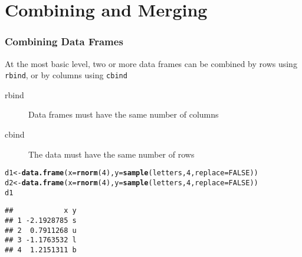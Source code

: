 \documentclass[paper=screen,mathserif]{beamer}\usepackage[]{graphicx}\usepackage[]{color}
\makeatletter
\newcommand{\hlnum}[1]{\textcolor[rgb]{0.686,0.059,0.569}{#1}}%
\newcommand{\hlstd}[1]{\textcolor[rgb]{0.345,0.345,0.345}{#1}}%
\newcommand{\hlkwb}[1]{\textcolor[rgb]{0.69,0.353,0.396}{#1}}%
\newcommand{\hlkwc}[1]{\textcolor[rgb]{0.333,0.667,0.333}{#1}}%
\newcommand{\hlkwd}[1]{\textcolor[rgb]{0.737,0.353,0.396}{\textbf{#1}}}%
\newenvironment{kframe}{%
 \def\at@end@of@kframe{}%
 \ifinner\ifhmode%
  \def\at@end@of@kframe{\end{minipage}}%
  \begin{minipage}{\columnwidth}%
 \fi\fi%
 \def\FrameCommand##1{\hskip\@totalleftmargin \hskip-\fboxsep
 \colorbox{shadecolor}{##1}\hskip-\fboxsep
     \hskip-\linewidth \hskip-\@totalleftmargin \hskip\columnwidth}%
 \MakeFramed {\advance\hsize-\width
   \@totalleftmargin\z@ \linewidth\hsize
   \@setminipage}}%
 {\par\unskip\endMakeFramed%
 \at@end@of@kframe}
\newenvironment{knitrout}{}{} %
\newcommand{\ft}[1]{\frametitle{#1}}
\makeatother
\begin{document}
\section{Combining and Merging}

\begin{frame}[fragile]
  \ft{Combining Data Frames}
  
  At the most basic level, two or more data frames can be combined by
  rows using \verb=rbind=, or by columns using \verb=cbind=
  \begin{description}
  \item[rbind] Data frames must have the same number of columns
  \item[cbind] The data must have the same number of rows
  \end{description} 
\begin{knitrout}\scriptsize
{}\color{fgcolor}\begin{kframe}
\begin{alltt}
\hlstd{d1} \hlkwb{<-} \hlkwd{data.frame}\hlstd{(}\hlkwc{x} \hlstd{=} \hlkwd{rnorm}\hlstd{(}\hlnum{4}\hlstd{),} \hlkwc{y} \hlstd{=} \hlkwd{sample}\hlstd{(letters,} \hlnum{4}\hlstd{,} \hlkwc{replace} \hlstd{=} \hlnum{FALSE}\hlstd{))}
\hlstd{d2} \hlkwb{<-} \hlkwd{data.frame}\hlstd{(}\hlkwc{x} \hlstd{=} \hlkwd{rnorm}\hlstd{(}\hlnum{4}\hlstd{),} \hlkwc{y} \hlstd{=} \hlkwd{sample}\hlstd{(letters,} \hlnum{4}\hlstd{,} \hlkwc{replace} \hlstd{=} \hlnum{FALSE}\hlstd{))}
\hlstd{d1}
\end{alltt}
\begin{verbatim}
##            x y
## 1 -2.1928785 s
## 2  0.7911268 u
## 3 -1.1763532 l
## 4  1.2151311 b
\end{verbatim}
\end{kframe}
\end{knitrout}

\end{frame}
\end{document}
